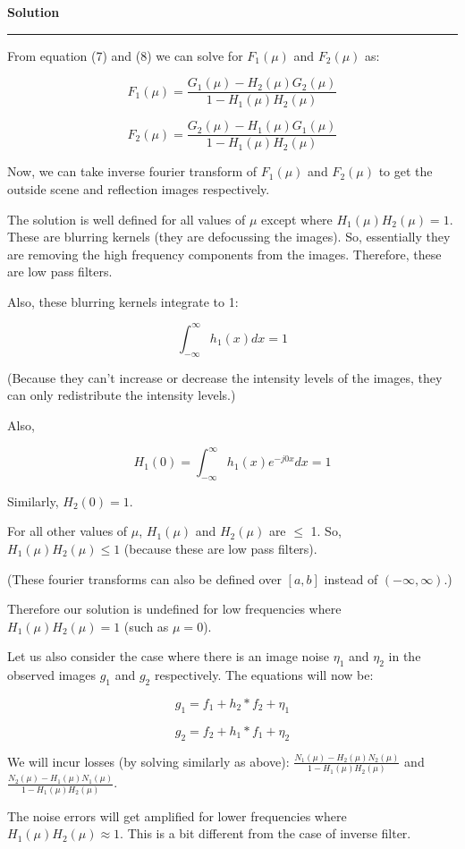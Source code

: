 \documentclass[a4paper,14pt]{article}
\newenvironment{solution}[2][]{%
    \begin{mdframed}[linecolor=blue!70!black, linewidth=2pt, roundcorner=10pt, backgroundcolor=yellow!10!white, skipabove=12pt, skipbelow=12pt]%
        \textbf{\large #2}
        \par\noindent\rule{\textwidth}{0.4pt}
}{
    \end{mdframed}
}
\begin{document}
\begin{solution}{Solution}
From equation (7) and (8) we can solve for $F_1(\mu)$ and $F_2(\mu)$ as:

\begin{equation}
    F_1(\mu) = \frac{G_1(\mu) - H_2(\mu)G_2(\mu)}{1 - H_1(\mu)H_2(\mu)}
\end{equation}

\begin{equation}
    F_2(\mu) = \frac{G_2(\mu) - H_1(\mu)G_1(\mu)}{1 - H_1(\mu)H_2(\mu)}
\end{equation}

Now, we can take inverse fourier transform of $F_1(\mu)$ and $F_2(\mu)$ to get the outside scene and reflection images respectively.


The solution is well defined for all values of $\mu$ except where $H_1(\mu)H_2(\mu) = 1$. These are blurring kernels (they are defocussing the images). So, essentially they are removing the high frequency components from the images. Therefore, these are low pass filters.


Also, these blurring kernels integrate to 1:

\begin{equation}
  \int_{-\infty}^{\infty} h_1 (x) dx = 1
\end{equation}

(Because they can't increase or decrease the intensity levels of the images, they can only redistribute the intensity levels.)

Also, 

\begin{equation}
  H_1(0) = \int_{-\infty}^{\infty} h_1 (x) e^{-j0x} dx = 1
\end{equation}

Similarly, $H_2(0) = 1$.

For all other values of $\mu$, $H_1(\mu)$ and $H_2(\mu)$ are $\leq$ 1. So, $H_1(\mu)H_2(\mu) \leq 1$ (because these are low pass filters).

(These fourier transforms can also be defined over $[a, b]$ instead of $(-\infty, \infty)$.)


Therefore our solution is undefined for low frequencies where $H_1(\mu)H_2(\mu) = 1$ (such as $\mu = 0$). 


Let us also consider the case where there is an image noise $\eta_1$ and $\eta_2$ in the observed images $g_1$ and $g_2$ respectively. The equations will now be:

\begin{equation}
    g_1 = f_1 + h_2*f_2 + \eta_1
\end{equation}

\begin{equation}
    g_2 = f_2 + h_1*f_1 + \eta_2
\end{equation}

We will incur losses (by solving similarly as above): $\frac{N_1(\mu)-H_2(\mu)N_2(\mu)}{1-H_1(\mu)H_2(\mu)}$ and $\frac{N_2(\mu)-H_1(\mu)N_1(\mu)}{1-H_1(\mu)H_2(\mu)}$.

The noise errors will get amplified for lower frequencies where $H_1(\mu)H_2(\mu) \approx 1$.
This is a bit different from the case of inverse filter.



\end{solution}
\end{document}
